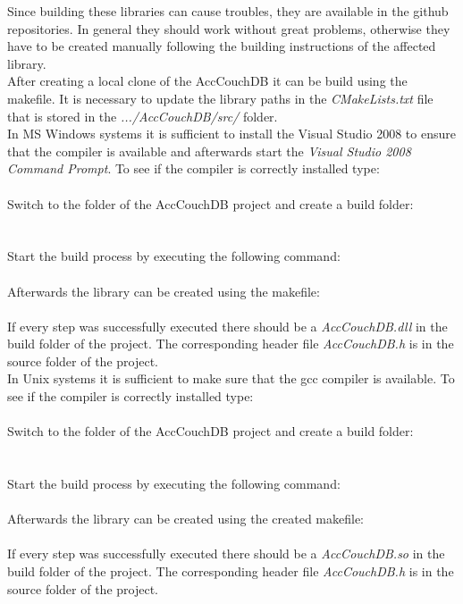 Since building these libraries can cause troubles, they are available in the github repositories. In general they should work without great problems, otherwise they have to be created manually following the building instructions of the affected library. \\

After creating a local clone of the AccCouchDB it can be build using the makefile. It is necessary to update the library paths in the \textit{CMakeLists.txt} file that is stored in the \textit{.../AccCouchDB/src/} folder. \\

In MS Windows systems it is sufficient to install the Visual Studio 2008 to ensure that the compiler is available and afterwards start the \textit{Visual Studio 2008 Command Prompt}. To see if the compiler is correctly installed type:\\
\\
Switch to the folder of the AccCouchDB project and create a build folder:\\
\\
\\
Start the build process by executing the following command:\\
\\
Afterwards the library can be created using the makefile:\\
\\
If every step was successfully executed there should be a \textit{AccCouchDB.dll} in the build folder of the project. The corresponding header file \textit{AccCouchDB.h} is in the source folder of the project.\\

In Unix systems it is sufficient to make sure that the gcc compiler is available. To see if the compiler is correctly installed type:\\
\\
Switch to the folder of the AccCouchDB project and create a build folder:\\
\\
\\
Start the build process by executing the following command:\\
\\
Afterwards the library can be created using the created makefile:\\
\\
If every step was successfully executed there should be a \textit{AccCouchDB.so} in the build folder of the project. The corresponding header file \textit{AccCouchDB.h} is in the source folder of the project.\\

